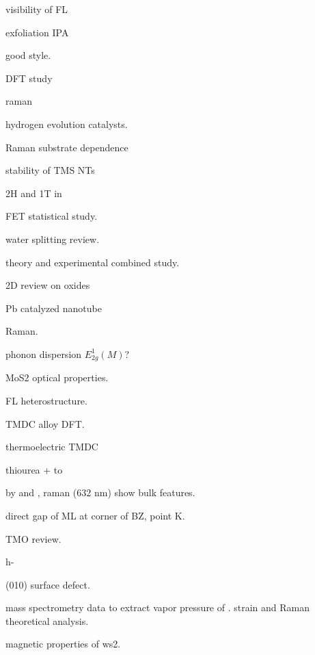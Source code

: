 visibility of FL \cite{Benameur2011}

exfoliation IPA \cite{Halim2013}  \cite{Zhou2011a}

 good style. \cite{Siciliano2009} \cite{Abdellaoui1997}

  DFT study \cite{B511044K} \cite{Cora1997} \cite{Sayede2005}

 raman \cite{Lee2002}



hydrogen evolution catalysts. \cite{Merki2011}

Raman substrate dependence \cite{Buscema2013}

stability of TMS NTs \cite{Seifert2002}

2H and 1T in  \cite{Eda2012}

 FET statistical study. \cite{Liu2013i}

water splitting review. \cite{B800489G}

 theory and experimental combined study. \cite{Klein2001}

2D review on oxides \cite{Osada2012}

Pb catalyzed  nanotube \cite{Brontvein2012}

 Raman.\cite{Zhao2013} \cite{Sekine1980}

phonon dispersion $E_{2g}^1(M)$? \cite{Ataca2012}

MoS2 optical properties.\cite{Search1979}

FL heterostructure. \cite{Yu2013a}

\cite{Kang2013} TMDC alloy DFT.

thermoelectric TMDC \cite{Wickramaratne2014}

 thiourea +  to  \cite{Leonard-Deepak2011}

 by  and , raman (632 nm) show bulk features\cite{Tenne2008}.

direct gap of ML at corner of BZ, point K.

TMO review.\cite{Goodenough2013}

h- \cite{Lunk2010} \cite{Zheng2009}

 (010) surface defect. \cite{Chen2001}

mass spectrometry data to extract vapor pressure of .
strain and Raman theoretical analysis.\cite{Chang2013a} 

magnetic properties of ws2.\cite{Zhang2013j} 


